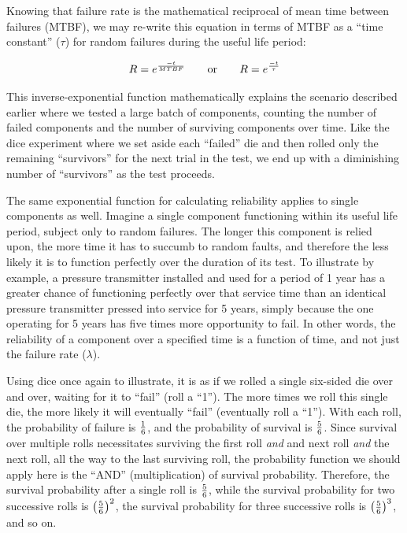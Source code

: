 \vskip 10pt

Knowing that failure rate is the mathematical reciprocal of mean time between failures (MTBF), we may re-write this equation in terms of MTBF as a ``time constant'' ($\tau$) for random failures during the useful life period:

$$R = e^{-t \over MTBF} \hskip 20pt \hbox{or} \hskip 20pt R = e^{-t \over \tau}$$

This inverse-exponential function mathematically explains the scenario described earlier where we tested a large batch of components, counting the number of failed components and the number of surviving components over time.  Like the dice experiment where we set aside each ``failed'' die and then rolled only the remaining ``survivors'' for the next trial in the test, we end up with a diminishing number of ``survivors'' as the test proceeds.

The same exponential function for calculating reliability applies to single components as well.  Imagine a single component functioning within its useful life period, subject only to random failures.  The longer this component is relied upon, the more time it has to succumb to random faults, and therefore the less likely it is to function perfectly over the duration of its test.  To illustrate by example, a pressure transmitter installed and used for a period of 1 year has a greater chance of functioning perfectly over that service time than an identical pressure transmitter pressed into service for 5 years, simply because the one operating for 5 years has five times more opportunity to fail.  In other words, the reliability of a component over a specified time is a function of time, and not just the failure rate ($\lambda$).

\filbreak

Using dice once again to illustrate, it is as if we rolled a single six-sided die over and over, waiting for it to ``fail'' (roll a ``1'').  The more times we roll this single die, the more likely it will eventually ``fail'' (eventually roll a ``1'').  With each roll, the probability of failure is $1 \over 6$, and the probability of survival is $5 \over 6$.  Since survival over multiple rolls necessitates surviving the first roll \textit{and} and next roll \textit{and} the next roll, all the way to the last surviving roll, the probability function we should apply here is the ``AND'' (multiplication) of survival probability.  Therefore, the survival probability after a single roll is $5 \over 6$, while the survival probability for two successive rolls is $\left(5 \over 6\right)^2$, the survival probability for three successive rolls is $\left(5 \over 6\right)^3$, and so on.

